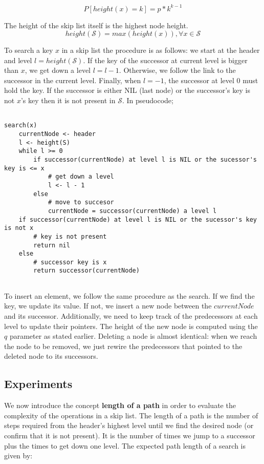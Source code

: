 \documentclass[a4paper,10pt,table,xcdraw]{article}
\begin{document}
\[P[height(x)=k] = p*k^{k-1} \]

The height of the skip list itself is the highest node height.
\[height(\mathcal{S}) = max(height(x)), \forall x \in \mathcal{S}\]

To search a key $x$ in a skip list the procedure is as follows: we start at the header and level $l=height(\mathcal{S})$. If the key of the successor at current level is bigger than $x$, we get down a level $l = l - 1$. Otherwise, we follow the link to the successor in the current level. Finally, when $l=-1$, the successor at level 0 must hold the key. If the successor is either NIL (last node) or the successor's key is not $x$'s key then it is not present in $\mathcal{S}$. In pseudocode;

\begin{verbatim}

search(x)
    currentNode <- header
    l <- height(S)
    while l >= 0
        if successor(currentNode) at level l is NIL or the sucessor's key is <= x 
            # get down a level
            l <- l - 1 
        else 
            # move to succesor
            currentNode = successor(currentNode) a level l
    if successor(currentNode) at level l is NIL or the sucessor's key is not x 
        # key is not present
        return nil
    else
        # successor key is x
        return successor(currentNode)
	
\end{verbatim}

To insert an element, we follow the same procedure as the search. If we find the key, we update its value. If not, we insert a new node between the $currentNode$ and its successor. Additionally, we need to keep track of the predecessors at each level to update their pointers. The height of the new node is computed using the $q$ parameter as stated earlier. Deleting a node is almost identical: when we reach the node to be removed, we just rewire the predecessors that pointed to the deleted node to its successors.


\subsection{Experiments}

We now introduce the concept \textbf{length of a path} in order to evaluate the complexity of the operations in a skip list. The length of a path is the number of steps required from the header's highest level until we find the desired node (or confirm that it is not present). It is the number of times we jump to a successor plus the times to get down one level. The expected path length of a search is given by:
\end{document}

